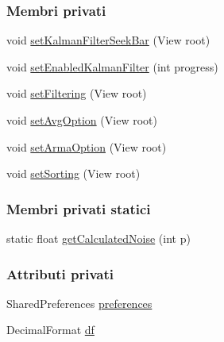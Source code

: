 \subsubsection*{Membri privati}
\begin{DoxyCompactItemize}
\item 
void \hyperlink{classit_1_1unibo_1_1torsello_1_1bluetoothpositioning_1_1fragment_1_1SettingsFragment_a84057f1633708ec85de5968ed9e7f032_a84057f1633708ec85de5968ed9e7f032}{set\+Kalman\+Filter\+Seek\+Bar} (View root)
\item 
void \hyperlink{classit_1_1unibo_1_1torsello_1_1bluetoothpositioning_1_1fragment_1_1SettingsFragment_ae16c093ba7bc137acf21dfc221cdcf56_ae16c093ba7bc137acf21dfc221cdcf56}{set\+Enabled\+Kalman\+Filter} (int progress)
\item 
void \hyperlink{classit_1_1unibo_1_1torsello_1_1bluetoothpositioning_1_1fragment_1_1SettingsFragment_a0d7b911602439aaf2a9ee4d5f9e41088_a0d7b911602439aaf2a9ee4d5f9e41088}{set\+Filtering} (View root)
\item 
void \hyperlink{classit_1_1unibo_1_1torsello_1_1bluetoothpositioning_1_1fragment_1_1SettingsFragment_a0f26c84f3a3dfffabfed1db04303b8b0_a0f26c84f3a3dfffabfed1db04303b8b0}{set\+Avg\+Option} (View root)
\item 
void \hyperlink{classit_1_1unibo_1_1torsello_1_1bluetoothpositioning_1_1fragment_1_1SettingsFragment_a093ab503fb5dc6ddb859b128b614d902_a093ab503fb5dc6ddb859b128b614d902}{set\+Arma\+Option} (View root)
\item 
void \hyperlink{classit_1_1unibo_1_1torsello_1_1bluetoothpositioning_1_1fragment_1_1SettingsFragment_ae29f0b3d6fc60f1ceeab5dcc530166c1_ae29f0b3d6fc60f1ceeab5dcc530166c1}{set\+Sorting} (View root)
\end{DoxyCompactItemize}
\subsubsection*{Membri privati statici}
\begin{DoxyCompactItemize}
\item 
static float \hyperlink{classit_1_1unibo_1_1torsello_1_1bluetoothpositioning_1_1fragment_1_1SettingsFragment_a595d859602f34ca81957a0578c1602a6_a595d859602f34ca81957a0578c1602a6}{get\+Calculated\+Noise} (int p)
\end{DoxyCompactItemize}
\subsubsection*{Attributi privati}
\begin{DoxyCompactItemize}
\item 
Shared\+Preferences \hyperlink{classit_1_1unibo_1_1torsello_1_1bluetoothpositioning_1_1fragment_1_1SettingsFragment_a52480c4d5d81ca59fe4a98ae3c623ea4_a52480c4d5d81ca59fe4a98ae3c623ea4}{preferences}
\item 
Decimal\+Format \hyperlink{classit_1_1unibo_1_1torsello_1_1bluetoothpositioning_1_1fragment_1_1SettingsFragment_af6b80a700dc80c39a56d001b68a47694_af6b80a700dc80c39a56d001b68a47694}{df}
\end{DoxyCompactItemize}
